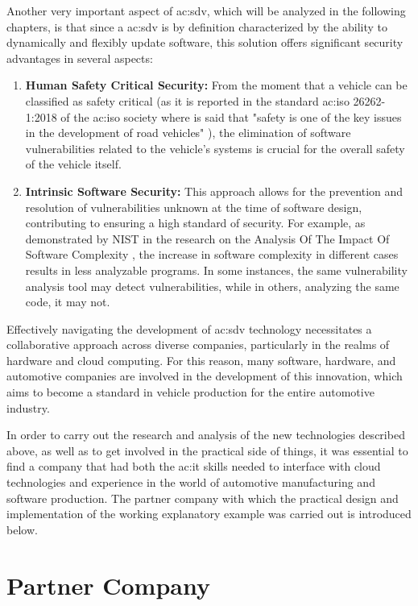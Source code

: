 Another very important aspect of \gls{ac:sdv}, which will be analyzed in the following chapters, is that since a \gls{ac:sdv} is by definition characterized by the ability to dynamically and flexibly update software, this solution offers significant security advantages in several aspects:
\begin{enumerate}
  \item \textbf{Human Safety Critical Security:} From the moment that a vehicle can be classified as safety critical (as it is reported in the standard \gls{ac:iso} 26262-1:2018 of the \gls{ac:iso} society where is said that "safety is one of the key issues in the development of road vehicles" \cite{ISO26262}), the elimination of software vulnerabilities related to the vehicle's systems is crucial for the overall safety of the vehicle itself.  
  \item \textbf{Intrinsic Software Security:} This approach allows for the prevention and resolution of vulnerabilities unknown at the time of software design, contributing to ensuring a high standard of security. For example, as demonstrated by NIST in the research on the Analysis Of The Impact Of Software Complexity \cite{NISTCodeComplexity}, the increase in software complexity in different cases results in less analyzable programs. In some instances, the same vulnerability analysis tool may detect vulnerabilities, while in others, analyzing the same code, it may not. 
\end{enumerate}

Effectively navigating the development of \gls{ac:sdv} technology necessitates a collaborative approach across diverse companies, particularly in the realms of hardware and cloud computing. For this reason, many software, hardware, and automotive companies are involved in the development of this innovation, which aims to become a standard in vehicle production for the entire automotive industry.

In order to carry out the research and analysis of the new technologies described above, as well as to get involved in the practical side of things, it was essential to find a company that had both the \gls{ac:it} skills needed to interface with cloud technologies and experience in the world of automotive manufacturing and software production. The partner company with which the practical design and implementation of the working explanatory example was carried out is introduced below.
\section{Partner Company}


